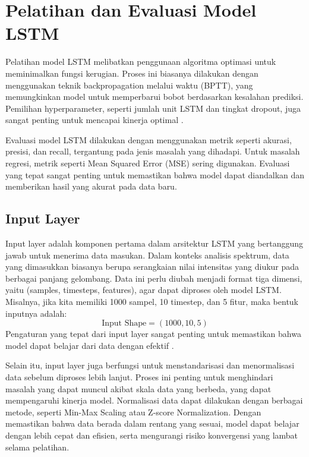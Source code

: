 \section{Pelatihan dan Evaluasi Model LSTM}
\par Pelatihan model LSTM melibatkan penggunaan algoritma optimasi untuk meminimalkan fungsi kerugian. Proses ini biasanya dilakukan dengan menggunakan teknik backpropagation melalui waktu (BPTT), yang memungkinkan model untuk memperbarui bobot berdasarkan kesalahan prediksi. Pemilihan hyperparameter, seperti jumlah unit LSTM dan tingkat dropout, juga sangat penting untuk mencapai kinerja optimal \citep{bengio2012}.

\par Evaluasi model LSTM dilakukan dengan menggunakan metrik seperti akurasi, presisi, dan recall, tergantung pada jenis masalah yang dihadapi. Untuk masalah regresi, metrik seperti Mean Squared Error (MSE) sering digunakan. Evaluasi yang tepat sangat penting untuk memastikan bahwa model dapat diandalkan dan memberikan hasil yang akurat pada data baru.



\subsection{Input Layer}
\par Input layer adalah komponen pertama dalam arsitektur LSTM yang bertanggung jawab untuk menerima data masukan. Dalam konteks analisis spektrum, data yang dimasukkan biasanya berupa serangkaian nilai intensitas yang diukur pada berbagai panjang gelombang. Data ini perlu diubah menjadi format tiga dimensi, yaitu (samples, timesteps, features), agar dapat diproses oleh model LSTM. Misalnya, jika kita memiliki 1000 sampel, 10 timestep, dan 5 fitur, maka bentuk inputnya adalah:
$$
\text{Input Shape} = (1000, 10, 5)
$$
Pengaturan yang tepat dari input layer sangat penting untuk memastikan bahwa model dapat belajar dari data dengan efektif \cite{hochreiter1997}.

\par Selain itu, input layer juga berfungsi untuk menstandarisasi dan menormalisasi data sebelum diproses lebih lanjut. Proses ini penting untuk menghindari masalah yang dapat muncul akibat skala data yang berbeda, yang dapat mempengaruhi kinerja model. Normalisasi data dapat dilakukan dengan berbagai metode, seperti Min-Max Scaling atau Z-score Normalization. Dengan memastikan bahwa data berada dalam rentang yang sesuai, model dapat belajar dengan lebih cepat dan efisien, serta mengurangi risiko konvergensi yang lambat selama pelatihan.

